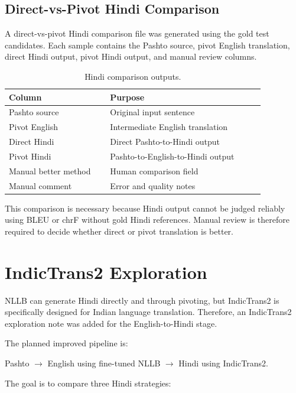 \documentclass[conference]{IEEEtran}
\begin{document}
\subsection{Direct-vs-Pivot Hindi Comparison}

A direct-vs-pivot Hindi comparison file was generated using the gold test candidates. Each sample contains the Pashto source, pivot English translation, direct Hindi output, pivot Hindi output, and manual review columns.

\begin{table}[H]
\centering
\caption{Hindi comparison outputs.}
\footnotesize
\begin{tabular}{p{0.34\linewidth}p{0.52\linewidth}}
\toprule
\textbf{Column} & \textbf{Purpose} \\
\midrule
Pashto source & Original input sentence \\
Pivot English & Intermediate English translation \\
Direct Hindi & Direct Pashto-to-Hindi output \\
Pivot Hindi & Pashto-to-English-to-Hindi output \\
Manual better method & Human comparison field \\
Manual comment & Error and quality notes \\
\bottomrule
\end{tabular}
\end{table}

This comparison is necessary because Hindi output cannot be judged reliably using BLEU or chrF without gold Hindi references. Manual review is therefore required to decide whether direct or pivot translation is better.

\section{IndicTrans2 Exploration}

NLLB can generate Hindi directly and through pivoting, but IndicTrans2 is specifically designed for Indian language translation. Therefore, an IndicTrans2 exploration note was added for the English-to-Hindi stage.

The planned improved pipeline is:

\begin{center}
Pashto $\rightarrow$ English using fine-tuned NLLB $\rightarrow$ Hindi using IndicTrans2.
\end{center}

The goal is to compare three Hindi strategies:
\end{document}
